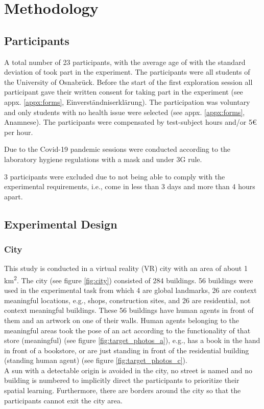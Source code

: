 \chapter{Methodology}

\section{Participants}

A total number of 23 participants,  with the average age of  with the standard deviation of  took part in the experiment. The participants were all students of the University of Osnabrück. Before the start of the first exploration session all participant gave their written consent for taking part in the experiment (see appx. \ref{appx:forms}, Einverständniserklärung). The participation was voluntary and only students with no health issue were selected (see appx. \ref{appx:forms}, Anamnese). The participants were compensated by test-subject hours and/or 5€ per hour.  

Due to the Covid-19 pandemic sessions were conducted according to the laboratory hygiene regulations with a mask and under 3G rule.

3 participants were excluded due to not being able to comply with the experimental requirements, i.e., come in less than 3 days and more than 4 hours apart.



\section{Experimental Design}

\subsection{City}

This study is conducted in a virtual reality (VR) city with an area of about 1 km\textsuperscript2. The city (see figure \ref{fig:city}) consisted of 284 buildings. 56 buildings were used in the experimental task from which 4 are global landmarks, 26 are {\emphasize context meaningful} locations, e.g., shops, construction sites, and 26 are residential, {\emphasize not context meaningful} buildings. These 56 buildings have human agents in front of them and an artwork on one of their walls. Human agents belonging to the meaningful areas took the pose of an act according to the functionality of that store {\emphasize(meaningful)} (see figure \ref{fig:target_photos_a}), e.g., has a book in the hand in front of a bookstore, or are just standing in front of the residential building {\emphasize(standing human agent)} (see figure \ref{fig:target_photos_c}). \\
A sun with a detectable origin is avoided in the city, no street is named and no building is numbered to implicitly direct the participants to prioritize their spatial learning. Furthermore, there are borders around the city so that the participants cannot exit the city area.

